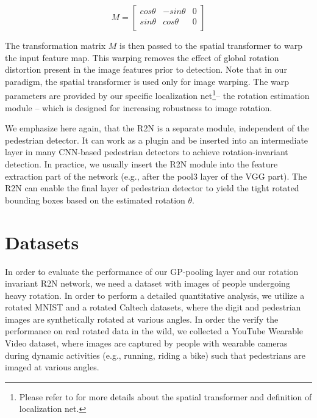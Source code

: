 \documentclass[10pt,twocolumn,letterpaper]{article}
\begin{document}
\vspace{-0.2cm}
\begin{equation} \label{eq:rot_matrix}
M = \begin{bmatrix}
    cos\theta   & -sin\theta & 0 \\
    sin\theta   & cos\theta & 0 \\
\end{bmatrix}
\end{equation}
\vspace{-0.2cm}

The transformation matrix $M$ is then passed to the spatial transformer to warp the input feature map. This warping removes the effect of global rotation distortion present in the image features prior to detection. Note that in our paradigm, the spatial transformer is used only for image warping. The warp parameters are provided by our specific localization net\footnote{Please refer to \cite{Jaderberg2015} for more details about the spatial transformer and definition of localization net.}-- the rotation estimation module -- which is designed for increasing robustness to image rotation. 

We emphasize here again, that the R2N is a separate module, independent of the pedestrian detector. It can work as a plugin and be inserted into an intermediate layer in many CNN-based pedestrian detectors to achieve rotation-invariant detection. In practice, we usually insert the R2N module into the feature extraction part of the network (e.g., after the pool3 layer of the VGG part). The R2N can enable the final layer of pedestrian detector to yield the tight rotated bounding boxes based on the estimated rotation $\theta$.


\section{Datasets}

In order to evaluate the performance of our GP-pooling layer and our rotation invariant R2N network, we need a dataset with images of people undergoing heavy rotation. In order to perform a detailed quantitative analysis, we utilize a rotated MNIST and a rotated Caltech datasets, where the digit and pedestrian images are synthetically rotated at various angles. In order the verify the performance on real rotated data in the wild, we collected a YouTube Wearable Video dataset, where images are captured by people with wearable cameras during dynamic activities (e.g., running, riding a bike) such that pedestrians are imaged at various angles.
\end{document}
